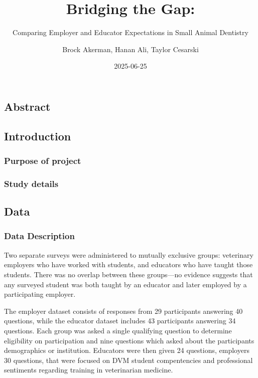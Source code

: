 \documentclass[
  11pt,
  letterpaper,
  DIV=11,
  numbers=noendperiod]{scrartcl}
\title{Bridging the Gap:}
\subtitle{Comparing Employer and Educator Expectations in Small Animal
Dentistry}
\author{Brock Akerman, Hanan Ali, Taylor Cesarski}
\date{2025-06-25}
\renewcommand*\contentsname{Table of contents}
\newcommand\contentsname{Table of contents}
\begin{document}
\maketitle

\renewcommand*\contentsname{Table of contents}
{
\hypersetup{linkcolor=}
\setcounter{tocdepth}{2}
\tableofcontents
}

\subsection{Abstract}\label{abstract}

\subsection{Introduction}\label{introduction}

\subsubsection{Purpose of project}\label{purpose-of-project}

\subsubsection{Study details}\label{study-details}

\subsection{Data}\label{data}

\subsubsection{Data Description}\label{data-description}

Two separate surveys were administered to mutually exclusive groups:
veterinary employers who have worked with students, and educators who
have taught those students. There was no overlap between these
groups---no evidence suggests that any surveyed student was both taught
by an educator and later employed by a participating employer.

The employer dataset consists of responses from 29 participants
answering 40 questions, while the educator dataset includes 43
participants answering 34 questions. Each group was asked a single
qualifying question to determine eligibility on participation and nine
questions which asked about the participants demographics or
institution. Educators were then given 24 questions, employers 30
questions, that were focused on DVM student compentencies and
professional sentiments regarding training in veterinarian medicine.
\end{document}
